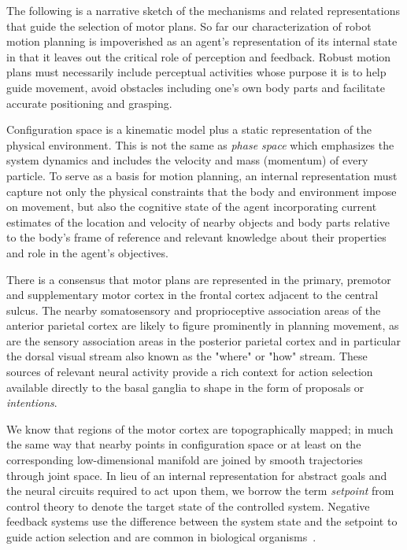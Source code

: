 The following is a narrative sketch of the mechanisms and related representations that guide the selection of motor plans. So far our characterization of robot motion planning is impoverished as an agent's representation of its internal state in that it leaves out the critical role of perception and feedback. Robust motion plans must necessarily include perceptual activities whose purpose it is to help guide movement, avoid obstacles including one's own body parts and facilitate accurate positioning and grasping.      

Configuration space is a kinematic model plus a static representation of the physical environment. This is not the same as {\it{phase space}} which emphasizes the system dynamics and includes the velocity and mass (momentum) of every particle. To serve as a basis for motion planning, an internal representation must capture not only the physical constraints that the body and environment impose on movement, but also the cognitive state of the agent incorporating current estimates of the location and velocity of nearby objects and body parts relative to the body's frame of reference and relevant knowledge about their properties and role in the agent's objectives.

There is a consensus that motor plans are represented in the primary, premotor and supplementary motor cortex in the frontal cortex adjacent to the central sulcus. The nearby somatosensory and proprioceptive association areas of the anterior parietal cortex are likely to figure prominently in planning movement, as are the sensory association areas in the posterior parietal cortex and in particular the dorsal visual stream also known as the "where" or "how" stream. These sources of relevant neural activity provide a rich context for action selection available directly to the basal ganglia to shape in the form of proposals or {\it{intentions}}.

We know that regions of the motor cortex are topographically mapped; in much the same way that nearby points in configuration space {\emdash{}} or at least on the corresponding low-dimensional manifold {\emdash{}} are joined by smooth trajectories through joint space. In lieu of an internal representation for abstract goals and the neural circuits required to act upon them, we borrow the term {\it{setpoint}} from control theory to denote the target state of the controlled system. Negative feedback systems use the difference between the system state and the setpoint to guide action selection and are common in biological organisms~\cite{Ashby1957cybernetics}.

